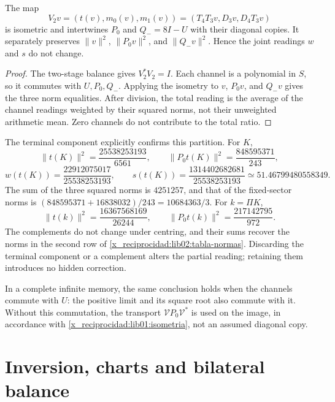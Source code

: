\begin{proposition}
\label{x_reciprocidad:lib02:memoria-ternaria}
The map
\[
 V_2v=(t(v),m_0(v),m_1(v))
 =(T_4T_3v,D_3v,D_4T_3v)
\]
is isometric and intertwines \(P_0\) and \(Q_-=8I-U\) with their diagonal copies. It separately preserves \(\|v\|^2\), \(\|P_0v\|^2\), and \(\|Q_-v\|^2\). Hence the joint readings \(w\) and \(s\) do not change.
\end{proposition}
\begin{proof}
The two-stage balance gives \(V_2^*V_2=I\). Each channel is a polynomial in \(S\), so it commutes with \(U,P_0,Q_-\). Applying the isometry to \(v\), \(P_0v\), and \(Q_-v\) gives the three norm equalities. After division, the total reading is the average of the channel readings weighted by their squared norms, not their unweighted arithmetic mean. Zero channels do not contribute to the total ratio.
\end{proof}

The terminal component explicitly confirms this partition. For \(K\),
\[
 \|t(K)\|^2=\frac{25538253193}{6561},\qquad
 \|P_0t(K)\|^2=\frac{848595371}{243},
\]
\[
 w(t(K))=\frac{22912075017}{25538253193},\qquad
 s(t(K))=\frac{1314402682681}{25538253193}
 \simeq51.46799480558349.
\]
The sum of the three squared norms is \(4251257\), and that of the fixed-sector norms is \((848595371+16838032)/243=10684363/3\). For \(k=\Pi K\),
\[
 \|t(k)\|^2=\frac{16367568169}{26244},\qquad
 \|P_0t(k)\|^2=\frac{217142795}{972}.
\]
The complements do not change under centring, and their sums recover the norms in the second row of \eqref{x_reciprocidad:lib02:tabla-normas}. Discarding the terminal component or a complement alters the partial reading; retaining them introduces no hidden correction.

In a complete infinite memory, the same conclusion holds when the channels commute with \(U\): the positive limit and its square root also commute with it. Without this commutation, the transport \(\mathcal VP_0\mathcal V^*\) is used on the image, in accordance with \cref{x_reciprocidad:lib01:isometria}, not an assumed diagonal copy.

\section{Inversion, charts and bilateral balance}
\label{x_reciprocidad:lib02:bidireccional}

